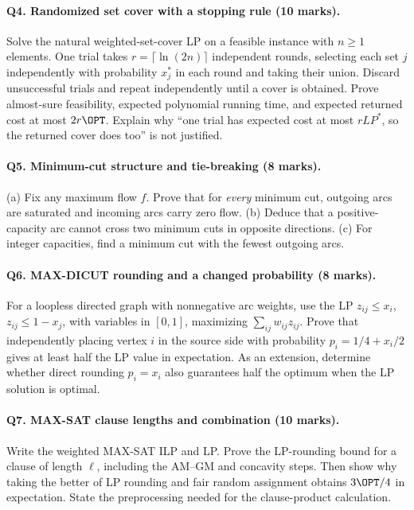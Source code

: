 \paragraph{Q4. Randomized set cover with a stopping rule (10 marks).}
Solve the natural weighted-set-cover LP on a feasible instance with $n\ge1$
elements.  One trial takes $r=\lceil\ln(2n)\rceil$ independent rounds,
selecting each set $j$ independently with probability $x_j^*$ in each round
and taking their union.  Discard unsuccessful trials and repeat independently
until a cover is obtained.  Prove almost-sure feasibility, expected polynomial
running time, and expected returned cost at most $2r\OPT$.  Explain why
``one trial has expected cost at most $rLP^*$, so the returned cover does
too'' is not justified.

\paragraph{Q5. Minimum-cut structure and tie-breaking (8 marks).}
(a) Fix any maximum flow $f$.  Prove that for \emph{every} minimum cut,
outgoing arcs are saturated and incoming arcs carry zero flow.
(b) Deduce that a positive-capacity arc cannot cross two minimum cuts in
opposite directions.  (c) For integer capacities, find a minimum cut with
the fewest outgoing arcs.

\paragraph{Q6. MAX-DICUT rounding and a changed probability (8 marks).}
For a loopless directed graph with nonnegative arc weights, use the LP
$z_{ij}\le x_i$, $z_{ij}\le1-x_j$, with variables in $[0,1]$, maximizing
$\sum_{ij}w_{ij}z_{ij}$.  Prove that independently placing vertex $i$ in
the source side with probability $p_i=1/4+x_i/2$ gives at least half the
LP value in expectation.  As an extension, determine whether direct
rounding $p_i=x_i$ also guarantees half the optimum when the LP solution
is optimal.

\paragraph{Q7. MAX-SAT clause lengths and combination (10 marks).}
Write the weighted MAX-SAT ILP and LP.  Prove the LP-rounding bound for a
clause of length $\ell$, including the AM--GM and concavity steps.  Then
show why taking the better of LP rounding and fair random assignment
obtains $3\OPT/4$ in expectation.  State the preprocessing needed for
the clause-product calculation.

